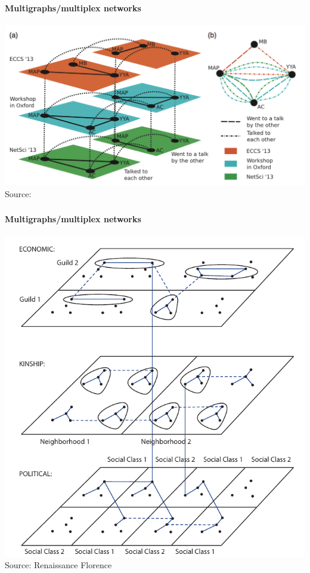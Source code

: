 \documentclass[8pt]{beamer}
\begin{document}

\begin{frame}
\frametitle{\insertsection}
\framesubtitle{Multigraphs/multiplex networks}

\centering
\includegraphics[width=\linewidth,height=0.7\textheight,keepaspectratio]{multiplex_layers}\\
\tiny{Source: \cite{Kivela2014}}
	
\end{frame}


\begin{frame}
\frametitle{\insertsection}
\framesubtitle{Multigraphs/multiplex networks}

\centering
\includegraphics[width=\linewidth,height=0.7\textheight,keepaspectratio]{powell}\\	
\tiny{Source: Renaissance Florence \cite{Powell2012}}
	
\end{frame}
\end{document}

